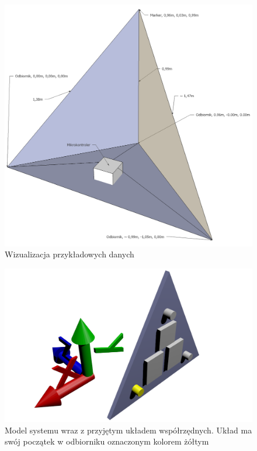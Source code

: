 \begin{figure}
  \includegraphics[width=\textwidth]{gfx/wizualizacja_3d.png}
  \caption{Wizualizacja przykładowych danych}
  \label{fig:trilateration_sample}
\end{figure}

\begin{figure}
 \includegraphics[width=\textwidth]{gfx/uklad_render.png}
 \caption[Model systemu i przyjęty układ współrzędnych]{Model systemu wraz z przyjętym układem współrzędnych. Układ ma swój początek w odbiorniku oznaczonym kolorem żółtym}
 \label{fig:coordinate_system}
\end{figure}

